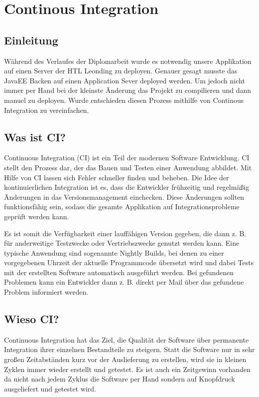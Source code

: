 \chapter{Continous Integration}
\section{Einleitung}\label{sec:einleitung}
Während des Verlaufes der Diplomarbeit wurde es notwendig unsere Applikation auf einen Server der HTL Leonding zu deployen. Genauer gesagt musste das JavaEE Backen auf einen Application Sever deployed werden. Um jedoch nicht immer per Hand bei der kleinste Änderung das Projekt zu compilieren und dann manuel zu deployen. Wurde entschieden diesen Prozess mithilfe von Continous Integration zu vereinfachen.

\section{Was ist CI?}\label{sec:cierklärung}
Continuous Integration (CI) ist ein Teil der modernen Software Entwicklung. CI stellt den Prozess dar, der das Bauen und Testen einer Anwendung abbildet. Mit Hilfe von CI lassen sich Fehler schneller finden und beheben. Die Idee der kontinuierlichen Integration ist es, dass die Entwickler frühzeitig und regelmäßig Änderungen in das Versionsmanagement einchecken. Diese Änderungen sollten funktionsfähig sein, sodass die gesamte Applikation auf Integrationsprobleme geprüft werden kann.

Es ist somit die Verfügbarkeit einer lauffähigen Version gegeben, die dann z. B. für anderweitige Testzwecke oder Vertriebszwecke genutzt werden kann. Eine typische Anwendung sind sogenannte Nightly Builds, bei denen zu einer vorgegebenen Uhrzeit der aktuelle Programmcode übersetzt wird und dabei Tests mit der erstellten Software automatisch ausgeführt werden. Bei gefundenen Problemen kann ein Entwickler dann z. B. direkt per Mail über das gefundene Problem informiert werden.

\section{Wieso CI?}\label{sec:whyci}
Continuous Integration hat das Ziel, die Qualität der Software über permanente Integration ihrer einzelnen Bestandteile zu steigern. Statt die Software nur in sehr großen Zeitabständen kurz vor der Auslieferung zu erstellen, wird sie in kleinen Zyklen immer wieder erstellt und getestet. Es ist auch ein Zeitgewinn vorhanden da nicht nach jedem Zyklus die Software per Hand sondern auf Knopfdruck ausgeliefert und getestet wird.

